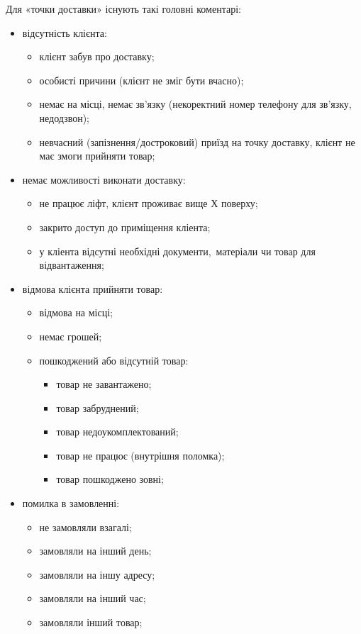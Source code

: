 Для «точки доставки» існують такі головні коментарі:
\begin{itemize}
	\item відсутність клієнта:
	\begin{itemize}
		\item клієнт забув про доставку;
		\item особисті причини (клієнт не зміг бути вчасно);
		\item немає на місці, немає зв'язку (некоректний номер телефону для зв'язку, недодзвон);
		\item невчасний (запізнення/достроковий) приїзд на точку доставку, клієнт не має змоги прийняти товар;
	\end{itemize}
	\item немає можливості виконати доставку:
	\begin{itemize}
		\item не працює ліфт, клієнт проживає вище Х поверху;
		\item закрито доступ до приміщення кліента;
		\item у кліента відсутні необхідні документи, матеріали чи товар для відвантаження;
	\end{itemize}
	\item відмова клієнта прийняти товар:
	\begin{itemize}
		\item відмова на місці;
		\item немає грошей;
		\item пошкоджений або відсутній товар:
		\begin{itemize}
			\item товар не завантажено;
			\item товар забруднений;
			\item товар недоукомплектований;
			\item товар не працює (внутрішня поломка);
			\item товар пошкоджено зовні;
		\end{itemize}
	\end{itemize}
	\item помилка в замовленні:
	\begin{itemize}
		\item не замовляли взагалі;
		\item замовляли на інший день;
		\item замовляли на іншу адресу;
		\item замовляли на інший час;
		\item замовляли інший товар;

\end{itemize}
\end{itemize}
